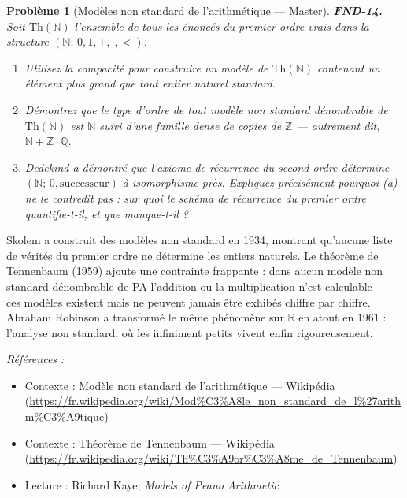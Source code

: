 \documentclass[11pt]{article}
\newtheorem{problem}{Problème}
\newenvironment{refs}{\par\small\noindent\emph{Références :}\begin{itemize}\setlength\itemsep{0pt}}{\end{itemize}\normalsize}
\begin{document}
\bigskip

\begin{problem}[{Modèles non standard de l'arithmétique --- Master}]
\textbf{FND-14.} Soit $ \mathrm{Th}(\mathbb{N}) $ l'ensemble de tous les
énoncés du premier ordre vrais dans la structure $ (\mathbb{N};\, 0, 1, +, \cdot, <) $.
\begin{enumerate}
\item[(a)] Utilisez la compacité pour construire un modèle de $ \mathrm{Th}(\mathbb{N}) $ contenant un
élément plus grand que tout entier naturel standard.
\item[(b)] Démontrez que le type d'ordre de tout
modèle non standard dénombrable de $ \mathrm{Th}(\mathbb{N}) $ est $ \mathbb{N} $ suivi d'une
famille dense de copies de $ \mathbb{Z} $ --- autrement dit, $ \mathbb{N} + \mathbb{Z} \cdot
\mathbb{Q} $.
\item[(c)] Dedekind a démontré que l'axiome de récurrence du \textit{second ordre} détermine
$ (\mathbb{N};\, 0, \mathrm{successeur}) $ à isomorphisme près. Expliquez précisément pourquoi
(a) ne le contredit pas : sur quoi le schéma de récurrence du premier ordre quantifie-t-il, et que
manque-t-il ?
\end{enumerate}

\end{problem}

\noindent Skolem a construit des modèles non standard en 1934, montrant qu'aucune liste
de vérités du premier ordre ne détermine les entiers naturels. Le théorème de Tennenbaum (1959)
ajoute une contrainte frappante : dans aucun modèle non standard dénombrable de PA l'addition ou
la multiplication n'est calculable --- ces modèles existent mais ne peuvent jamais être exhibés
chiffre par chiffre. Abraham Robinson a transformé le même phénomène sur $\mathbb{R}$ en atout en 1961 :
l'analyse non standard, où les infiniment petits vivent enfin rigoureusement.

\begin{refs}
\item Contexte : Modèle non standard de l'arithmétique --- Wikipédia (\url{https://fr.wikipedia.org/wiki/Mod%C3%A8le_non_standard_de_l%27arithm%C3%A9tique})
\item Contexte : Théorème de Tennenbaum --- Wikipédia (\url{https://fr.wikipedia.org/wiki/Th%C3%A9or%C3%A8me_de_Tennenbaum})
\item Lecture : Richard Kaye, \textit{Models of Peano Arithmetic}
\end{refs}
\end{document}
